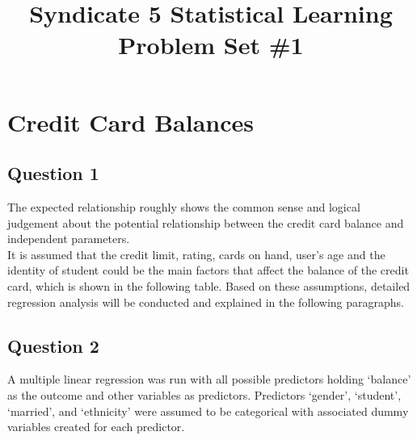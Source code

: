 \documentclass[11pt]{article}
\begin{document}
\title{Syndicate 5 Statistical Learning Problem Set \#1}
\maketitle
{}
{\setlength{\parindent}{0cm}



\section*{Credit Card Balances}
\subsection*{Question 1}
The expected relationship roughly shows the common sense and logical judgement about the potential relationship between the credit card balance and independent parameters.\\

It is assumed that the credit limit, rating, cards on hand, user’s age and the identity of student could be the main factors that affect the balance of the credit card, which is shown in the following table. Based on these assumptions, detailed regression analysis will be conducted and explained in the following paragraphs. 


\subsection*{Question 2}
A multiple linear regression was run with all possible predictors holding ‘balance’ as the outcome and other variables as predictors. Predictors ‘gender’, ‘student’, ‘married’, and ‘ethnicity’ were assumed to be categorical with associated dummy variables created for each predictor.\\ 

}
\end{document}
